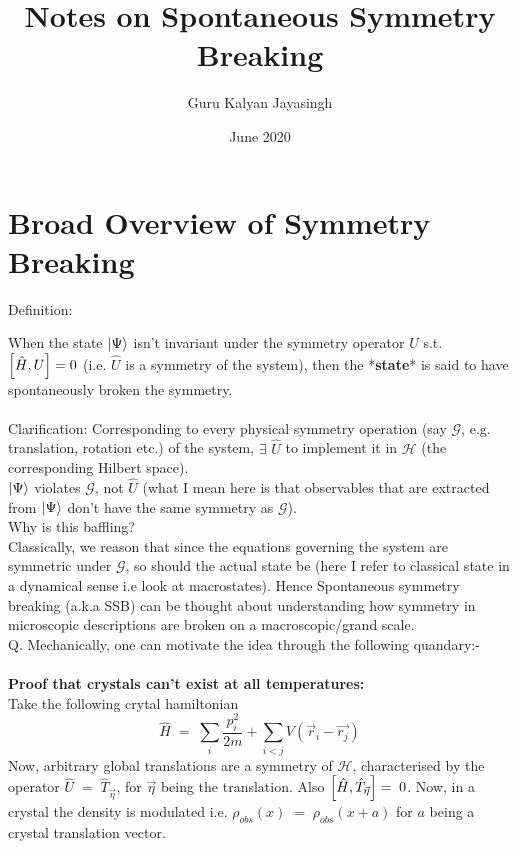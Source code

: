 \documentclass[12pt]{article}
\title{\Huge{Notes on Spontaneous Symmetry Breaking}}
\author{\Large{Guru Kalyan Jayasingh}}
\date{\Large{June 2020}}
\begin{document}
\begin{titlingpage}
\maketitle
\end{titlingpage}



\large
\section{Broad Overview of Symmetry Breaking}
Definition:

When the state $\ket{\Psi}$ isn't invariant under the symmetry operator $\hat{U}$
s.t. $\comm{\hat{H}}{U}=0$ (i.e. $\hat{U}$ is a symmetry of the system), then the *\textbf{state}* is said to have spontaneously broken the symmetry.\\
\\
Clarification: Corresponding to every physical symmetry operation (say $\mathcal{G}$, e.g. translation, rotation etc.) of the system, $\exists$ $\hat{U}$ to implement it in $\mathscr{H}$ (the corresponding Hilbert space). \\
$\ket{\Psi}$ violates $\mathcal{G}$, not $\hat{U}$ (what I mean here is that observables that are extracted from $\ket{\Psi}$ don't have the same symmetry as $\mathcal{G}$). \\
\newline
Why is this baffling?\\  
Classically, we reason that since the equations governing the system are symmetric under $\mathcal{G}$, so should the actual state be (here I refer to classical state in a dynamical sense i.e look at macrostates). Hence Spontaneous symmetry breaking (a.k.a SSB) can be thought about understanding how symmetry in microscopic descriptions are broken on a macroscopic/grand scale.\\
Q. Mechanically, one can motivate the idea through the following quandary:-\\
\\
\textbf{Proof that crystals can't exist at all temperatures:}\\
Take the following crytal hamiltonian
$$\hat{H}\;=\;\sum_i \frac{p_i^2}{2m}+\sum_{i<j}V(\Vec{r}_i-\Vec{r_j})$$
Now, arbitrary global translations are a symmetry of $\mathcal{H}$, characterised by the operator $\hat{U}\;=\;\hat{T}_{\Vec{\eta}}$, for $\Vec{\eta}$ being the translation. Also $\comm{\hat{H}}{\hat{T}_{\Vec{\eta}}}=\;0$. Now, in a crystal the density is modulated i.e. $\rho_{obs}(x)\;=\;\rho_{obs}(x+a)$ for $a$ being a crystal translation vector.\\
\end{document}
